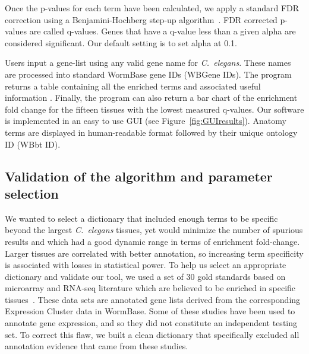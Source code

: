 \documentclass{bmcart}
\begin{document}
Once the p-values for each term have been calculated, we apply a standard FDR correction using a Benjamini-Hochberg step-up algorithm~\cite{Benjamini1995}. FDR corrected p-values are called q-values. Genes that have a q-value less than a given alpha are considered significant. Our default setting is to set alpha at 0.1. 

Users input a gene-list using any valid gene name for \emph{C.~elegans}. These names are processed into standard WormBase gene IDs (WBGene IDs). The program returns a table containing all the enriched terms and associated useful information %
. Finally, the program can also return a bar chart of the enrichment fold change for the fifteen tissues with the lowest measured q-values. Our software is implemented in an easy to use GUI (see Figure~\ref{fig:GUIresults}). Anatomy terms are displayed in human-readable format followed by their unique ontology ID (WBbt ID).

\subsection*{Validation of the algorithm and parameter selection}
We wanted to select a dictionary that included enough terms to be specific beyond the largest \emph{C.~elegans} tissues, yet would minimize the number of spurious results and which had a good dynamic range in terms of enrichment fold-change. Larger tissues are correlated with better annotation, so increasing term specificity is associated with losses in statistical power.
To help us select an appropriate dictionary and validate our tool, we used a set of 30 gold standards based on microarray and RNA-seq literature which are believed to be enriched in specific tissues~\cite{Gaudet2004a, Spencer2011, Cinar2005, Watson2008a, Pauli2006, Portman2004, Fox2007, Smith2010}. These data sets are annotated gene lists derived from the corresponding Expression Cluster data in WormBase. Some of these studies have been used to annotate gene expression, and so they did not constitute an independent testing set. To correct this flaw, we built a clean dictionary that specifically excluded all annotation evidence that came from these studies.
\end{document}
